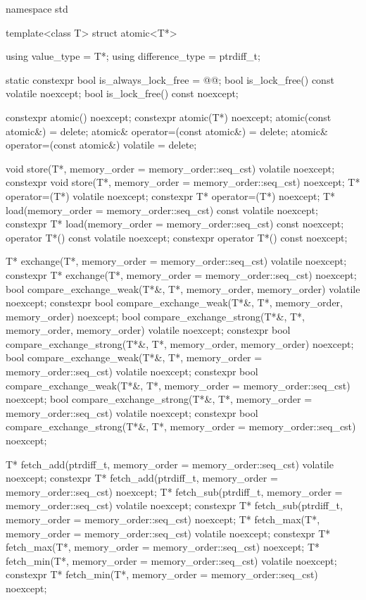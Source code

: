 \begin{codeblock}
namespace std {
  template<class T> struct atomic<T*> {
    using value_type = T*;
    using difference_type = ptrdiff_t;

    static constexpr bool is_always_lock_free = @@;
    bool is_lock_free() const volatile noexcept;
    bool is_lock_free() const noexcept;

    constexpr atomic() noexcept;
    constexpr atomic(T*) noexcept;
    atomic(const atomic&) = delete;
    atomic& operator=(const atomic&) = delete;
    atomic& operator=(const atomic&) volatile = delete;

    void store(T*, memory_order = memory_order::seq_cst) volatile noexcept;
    constexpr void store(T*, memory_order = memory_order::seq_cst) noexcept;
    T* operator=(T*) volatile noexcept;
    constexpr T* operator=(T*) noexcept;
    T* load(memory_order = memory_order::seq_cst) const volatile noexcept;
    constexpr T* load(memory_order = memory_order::seq_cst) const noexcept;
    operator T*() const volatile noexcept;
    constexpr operator T*() const noexcept;

    T* exchange(T*, memory_order = memory_order::seq_cst) volatile noexcept;
    constexpr T* exchange(T*, memory_order = memory_order::seq_cst) noexcept;
    bool compare_exchange_weak(T*&, T*, memory_order, memory_order) volatile noexcept;
    constexpr bool compare_exchange_weak(T*&, T*, memory_order, memory_order) noexcept;
    bool compare_exchange_strong(T*&, T*, memory_order, memory_order) volatile noexcept;
    constexpr bool compare_exchange_strong(T*&, T*, memory_order, memory_order) noexcept;
    bool compare_exchange_weak(T*&, T*,
                               memory_order = memory_order::seq_cst) volatile noexcept;
    constexpr bool compare_exchange_weak(T*&, T*,
                               memory_order = memory_order::seq_cst) noexcept;
    bool compare_exchange_strong(T*&, T*,
                                 memory_order = memory_order::seq_cst) volatile noexcept;
    constexpr bool compare_exchange_strong(T*&, T*,
                                 memory_order = memory_order::seq_cst) noexcept;

    T* fetch_add(ptrdiff_t, memory_order = memory_order::seq_cst) volatile noexcept;
    constexpr T* fetch_add(ptrdiff_t, memory_order = memory_order::seq_cst) noexcept;
    T* fetch_sub(ptrdiff_t, memory_order = memory_order::seq_cst) volatile noexcept;
    constexpr T* fetch_sub(ptrdiff_t, memory_order = memory_order::seq_cst) noexcept;
    T* fetch_max(T*, memory_order = memory_order::seq_cst) volatile noexcept;
    constexpr T* fetch_max(T*, memory_order = memory_order::seq_cst) noexcept;
    T* fetch_min(T*, memory_order = memory_order::seq_cst) volatile noexcept;
    constexpr T* fetch_min(T*, memory_order = memory_order::seq_cst) noexcept;

}}
\end{codeblock}
